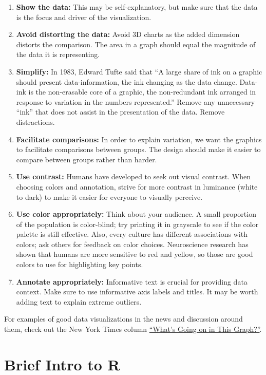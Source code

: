 \documentclass[
]{book}
\begin{document}
\begin{enumerate}
\def\labelenumi{\arabic{enumi}.}
\item
  \textbf{Show the data:} This may be self-explanatory, but make sure that the data is the focus and driver of the visualization.
\item
  \textbf{Avoid distorting the data:} Avoid 3D charts as the added dimension distorts the comparison. The area in a graph should equal the magnitude of the data it is representing.
\item
  \textbf{Simplify:} In 1983, Edward Tufte said that ``A large share of ink on a graphic should present data-information, the ink changing as the data change. Data-ink is the non-erasable core of a graphic, the non-redundant ink arranged in response to variation in the numbers represented.'' Remove any unnecessary ``ink'' that does not assist in the presentation of the data. Remove distractions.
\item
  \textbf{Facilitate comparisons:} In order to explain variation, we want the graphics to facilitate comparisons between groups. The design should make it easier to compare between groups rather than harder.
\item
  \textbf{Use contrast:} Humans have developed to seek out visual contrast. When choosing colors and annotation, strive for more contrast in luminance (white to dark) to make it easier for everyone to visually perceive.
\item
  \textbf{Use color appropriately:} Think about your audience. A small proportion of the population is color-blind; try printing it in grayscale to see if the color palette is still effective. Also, every culture has different associations with colors; ask others for feedback on color choices. Neuroscience research has shown that humans are more sensitive to red and yellow, so those are good colors to use for highlighting key points.
\item
  \textbf{Annotate appropriately:} Informative text is crucial for providing data context. Make sure to use informative axis labels and titles. It may be worth adding text to explain extreme outliers.
\end{enumerate}

For examples of good data visualizations in the news and discussion around them, check out the New York Times column \href{https://www.nytimes.com/column/whats-going-on-in-this-graph}{``What's Going on in This Graph?''}.

\section{Brief Intro to R}\label{brief-intro-to-r}
\end{document}
